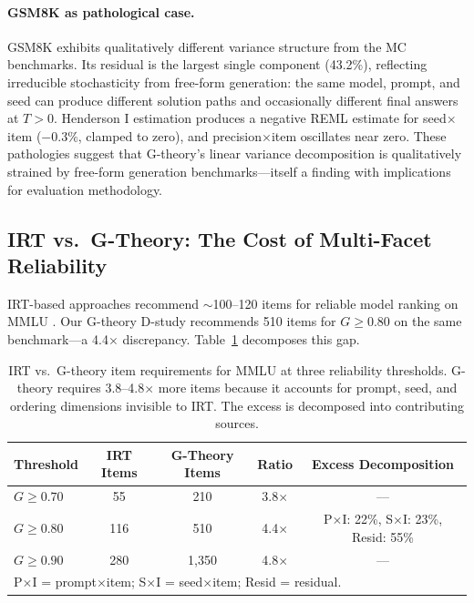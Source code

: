 \documentclass[11pt]{article}
\begin{document}
\paragraph{GSM8K as pathological case.}
GSM8K exhibits qualitatively different variance structure from the MC benchmarks.
Its residual is the largest single component (43.2\%), reflecting irreducible stochasticity from free-form generation: the same model, prompt, and seed can produce different solution paths and occasionally different final answers at $T > 0$.
Henderson I estimation produces a negative REML estimate for seed$\times$item ($-0.3\%$, clamped to zero), and precision$\times$item oscillates near zero.
These pathologies suggest that G-theory's linear variance decomposition is qualitatively strained by free-form generation benchmarks---itself a finding with implications for evaluation methodology.

\subsection{IRT vs.\ G-Theory: The Cost of Multi-Facet Reliability}
\label{sec:irt}

IRT-based approaches recommend $\sim$100--120 items for reliable model ranking on MMLU \citep{polo2024}.
Our G-theory D-study recommends 510 items for $G \geq 0.80$ on the same benchmark---a 4.4$\times$ discrepancy.
Table~\ref{tab:irt_vs_gtheory} decomposes this gap.

\begin{table}[t]
\centering
\caption{IRT vs.\ G-theory item requirements for MMLU at three reliability thresholds. G-theory requires 3.8--4.8$\times$ more items because it accounts for prompt, seed, and ordering dimensions invisible to IRT. The excess is decomposed into contributing sources.}
\label{tab:irt_vs_gtheory}
\small
\begin{tabular}{lcccc}
\toprule
\textbf{Threshold} & \textbf{IRT Items} & \textbf{G-Theory Items} & \textbf{Ratio} & \textbf{Excess Decomposition} \\
\midrule
$G \geq 0.70$ & 55  & 210   & 3.8$\times$ & --- \\
$G \geq 0.80$ & 116 & 510   & 4.4$\times$ & P$\times$I: 22\%, S$\times$I: 23\%, Resid: 55\% \\
$G \geq 0.90$ & 280 & 1{,}350 & 4.8$\times$ & --- \\
\bottomrule
\multicolumn{5}{l}{\footnotesize P$\times$I = prompt$\times$item; S$\times$I = seed$\times$item; Resid = residual.}
\end{tabular}
\end{table}
\end{document}
